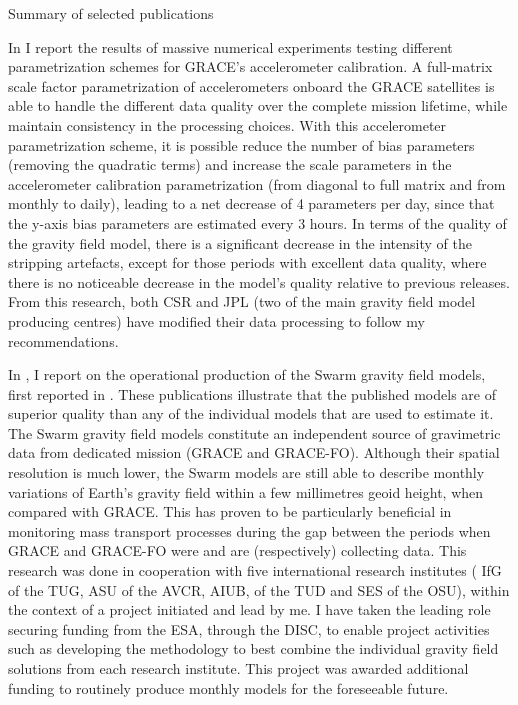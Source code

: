 
\begin{cvtext}{Summary of selected publications}


In \cite{TeixeiradaEncarnacao2020} I report the results of massive numerical experiments testing different parametrization schemes for GRACE's accelerometer calibration.
A full-matrix scale factor parametrization of accelerometers onboard the \ac{GRACE} satellites  is able to handle the different data quality over the complete mission lifetime, while maintain consistency in the processing choices.
With this accelerometer parametrization scheme, it is possible reduce the number of bias parameters (removing the quadratic terms) and increase the scale parameters in the accelerometer calibration parametrization (from diagonal to full matrix and from monthly to daily), leading to a net decrease of 4 parameters per day, since that the y-axis bias parameters are estimated every 3 hours.
In terms of the quality of the gravity field model, there is a significant decrease in the intensity of the stripping artefacts, except for those periods with excellent data quality, where there is no noticeable decrease in the model’s quality relative to previous releases.
From this research, both \ac{CSR} and \ac{JPL} (two of the main gravity field model producing centres) have modified their data processing to follow my recommendations.

In \cite{TeixeiraEncarnacao2019}, I report on the operational production of the Swarm gravity field models, first reported in \cite{TeixeiraEncarnacao2016}.
These publications illustrate that the published models are of superior quality than any of the individual models that are used to estimate it.
The Swarm gravity field models constitute an independent source of gravimetric data from dedicated mission (\ac{GRACE} and \ac{GRACE-FO}).
Although their spatial resolution is much lower, the Swarm models are still able to describe monthly variations of Earth's gravity field within a few millimetres geoid height, when compared with \ac{GRACE}.
This has proven to be particularly beneficial in monitoring mass transport processes during the gap between the periods when \ac{GRACE} and \ac{GRACE-FO} were and are (respectively) collecting data.
This research was done in cooperation with five international research institutes (
\acf{IfG} of the \acf{TUG},
\ac{ASU}  of the \acf{AVCR},
\acf{AIUB},
 of the \ac{TUD} and
\acf{SES} of the \acf{OSU}),
within the context of a project initiated and lead by me.
I have taken the leading role securing funding from the \ac{ESA}, through the \ac{DISC}, to enable project activities such as developing the methodology to best combine the individual gravity field solutions from each research institute.
This project was awarded additional funding to routinely produce monthly models for the foreseeable future.


\end{cvtext}
